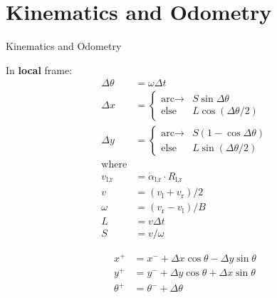 \documentclass{beamer}
\begin{document}
\section{Kinematics and Odometry}
\begin{frame}{Kinematics and Odometry}
  
  \begin{minipage}{0.5\columnwidth}
    In \textbf{local} frame:
    \vspace{-0.5\baselineskip}
    \begin{align*}
      \Delta\theta
      &=
      \omega \Delta t
      \\
      \Delta x
      &=
      \begin{cases}
        \text{arc} \rightarrow
        &
        S \sin \Delta \theta
        \\
        \text{else}
        &
        L \cos (\Delta \theta / 2)
      \end{cases}
      \\
      \Delta y
      &=
      \begin{cases}
        \text{arc} \rightarrow
        &
        S (1 - \cos \Delta \theta)
        \\
        \text{else}
        &
        L \sin (\Delta \theta / 2)
      \end{cases}
      \\
      \text{where}
      \\
      v_\text{l,r}
      &=
      \dot\alpha_\text{l,r} \cdot R_\text{l,r}
      \\
      v
      &=
      (v_\text{l} + v_\text{r}) / 2
      \\
      \omega
      &=
      (v_\text{r} - v_\text{l}) / B
      \\
      L
      &=
      v \Delta t
      \\
      S
      &=
      v / \omega
    \end{align*}
    
  \end{minipage}%
  \begin{minipage}{0.3\columnwidth}
    
    \def\svgwidth{1.4\columnwidth}
    

    \vspace{0.5\baselineskip}
    \vspace{-0.5\baselineskip}
    \begin{align*}
      x^+
      &=
      x^- + \Delta x \cos \theta - \Delta y \sin \theta
      \\
      y^+
      &=
      y^- + \Delta y \cos \theta + \Delta x \sin \theta
      \\
      \theta^+
      &=
      \theta^- + \Delta \theta
    \end{align*}
    
  \end{minipage}
  
\end{frame}
\end{document}
